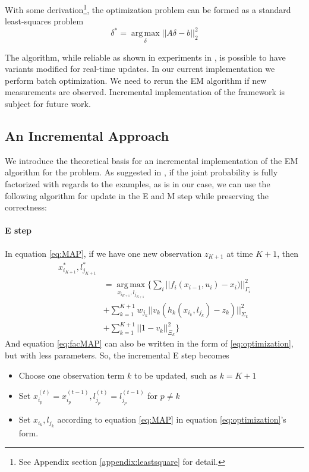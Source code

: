 With some derivation\footnote{See Appendix section \ref{appendix:leastsquare} for detail.}, the optimization problem can be formed as a standard least-squares problem
\begin{equation}
\delta^* = \operatorname*{arg\,max}_\delta||A\delta - b||_2^2
\label{eq:optimization}
\end{equation}


The algorithm, while reliable as shown in experiments in \cite{haehnel03iros}, is possible to have variants modified for real-time updates. In our current implementation we perform batch optimization. We need to rerun the EM algorithm if new measurements are observed. Incremental implementation of the framework is subject for future work.

\subsection{An Incremental Approach}
We introduce the theoretical basis for an incremental implementation of the EM algorithm for the problem. As suggested in \cite{neal1998EM}, if the joint probability is fully factorized with regards to the examples, as is in our case, we can use the following algorithm for update in the E and M step while preserving the correctness:

\paragraph{E step} 
In equation \ref{eq:MAP}, if we have one new observation $z_{K+1}$ at time $K+1$, then
\begin{equation}
\begin{aligned}
x_{i_{K+1}}^*, l_{j_{K+1}}^* \\
&= \operatorname*{arg\,max}_{ x_{i_{K+1}}, l_{j_{K+1}}} \{ 
\sum_{i}||f_i(x_{i-1}, u_i) - x_i)||^2_{\Gamma_i} \\
&+ \sum_{k=1}^{K+1} w_{j_k}||v_k(h_k(x_{i_k}, l_{j_k}) - z_k)||^2_{\Sigma_k} \\
&+ \sum_{k=1}^{K+1}||1-v_k||^2_{\Xi_k} \}
\end{aligned}
\label{eq:facMAP}
\end{equation}
And equation \ref{eq:facMAP} can also be written in the form of \ref{eq:optimization}, but with less parameters. So, the incremental E step becomes
\begin{itemize}
\item Choose one observation term $k$ to be updated, such as $k = K+1$
\item Set $x_{i_p}^{(t)} = x_{i_p}^{(t-1)}, l_{j_p}^{(t)} = l_{j_p}^{(t-1)}$ for $p \neq k$
\item Set $x_{i_k}, l_{j_k}$ according to equation \ref{eq:MAP} in equation \ref{eq:optimization}'s form.
\end{itemize}

